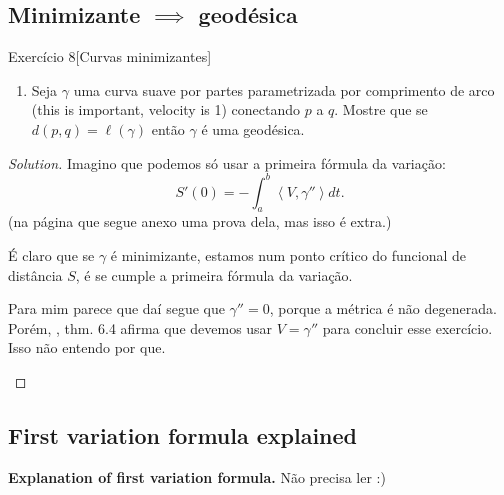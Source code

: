 \subsection{Minimizante \(\implies\) geodésica}

\begin{thing4}{Exercício 8}[Curvas minimizantes]\label{exer:8}\leavevmode
\begin{enumerate}[label=(\alph*)]
\item Seja \(\gamma\) uma curva suave por partes parametrizada por comprimento de arco (this is important, velocity is 1) conectando \(p\) a \(q\). Mostre que se \(d(p,q)=\ell(\gamma)\) então \(\gamma\) é uma geodésica.
\end{enumerate}
\end{thing4}

\begin{proof}[Solution]\leavevmode
Imagino que podemos só usar a primeira fórmula da variação:
\[S'(0)=-\int_a^b \left<V,\gamma''\right>dt.\]
(na página que segue anexo uma prova dela, mas isso é extra.)

É claro que se \(\gamma\) é minimizante, estamos num ponto crítico do funcional de distância \(S\), é se cumple a primeira fórmula da variação.

\begin{question}\leavevmode
Para mim parece que daí segue que \(\gamma''=0\), porque a métrica é não degenerada. Porém, \cite{ler}, thm. 6.4 afirma que devemos usar \(V=\gamma''\) para concluir esse exercício. Isso não entendo por que.
\end{question}
\end{proof}

\subsection{First variation formula explained}
\textbf{Explanation of first variation formula.} Não precisa ler :)

